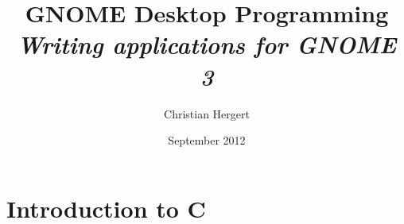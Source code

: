 

\title{
    GNOME Desktop Programming\\
    \textit{Writing applications for GNOME 3}
}
\author{Christian Hergert}
\date{September 2012}

\frontmatter
\maketitle
\tableofcontents

\mainmatter

\part{Introduction to C}

\appendix

